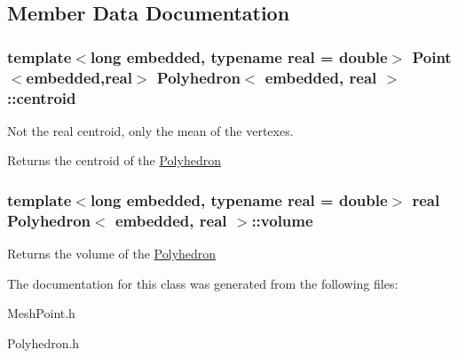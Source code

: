 \subsection{Member Data Documentation}
\subsubsection[{\texorpdfstring{centroid}{centroid}}]{\setlength{\rightskip}{0pt plus 5cm}template$<$long embedded, typename real  = double$>$ {\bf Point}$<$embedded,real$>$ {\bf Polyhedron}$<$ embedded, real $>$\+::centroid\hspace{0.3cm}{\ttfamily [protected]}}\hypertarget{class_polyhedron_ab7839d59898be24bb956fc41d1c66096}{}\label{class_polyhedron_ab7839d59898be24bb956fc41d1c66096}


Not the real centroid, only the mean of the vertexes. 

\begin{DoxyReturn}{Returns}
the centroid of the \hyperlink{class_polyhedron}{Polyhedron} 
\end{DoxyReturn}
\subsubsection[{\texorpdfstring{volume}{volume}}]{\setlength{\rightskip}{0pt plus 5cm}template$<$long embedded, typename real  = double$>$ real {\bf Polyhedron}$<$ embedded, real $>$\+::volume\hspace{0.3cm}{\ttfamily [protected]}}\hypertarget{class_polyhedron_a0f4ab3ccfdc65071201bdb0b55c2b683}{}\label{class_polyhedron_a0f4ab3ccfdc65071201bdb0b55c2b683}
\begin{DoxyReturn}{Returns}
the volume of the \hyperlink{class_polyhedron}{Polyhedron} 
\end{DoxyReturn}


The documentation for this class was generated from the following files\+:\begin{DoxyCompactItemize}
\item 
Mesh\+Point.\+h\item 
Polyhedron.\+h\end{DoxyCompactItemize}
